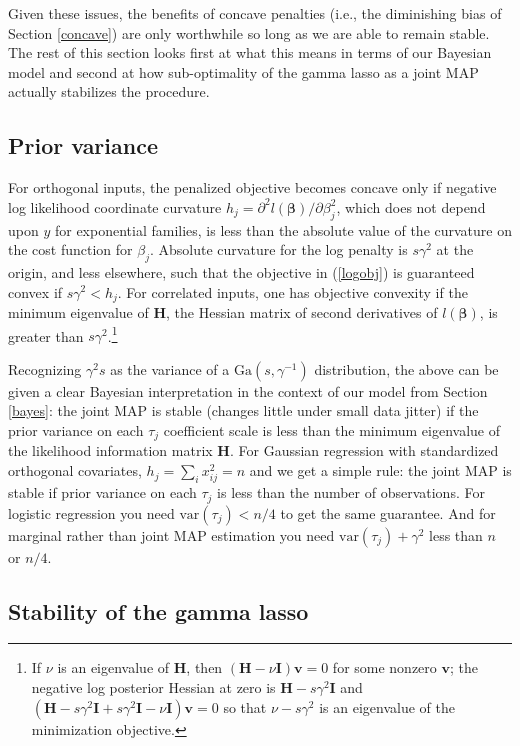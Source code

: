 \documentclass[12pt]{article}
\newcommand{\bs}[1]{\boldsymbol{#1}}
\newcommand{\mr}[1]{\mathrm{#1}}
\newcommand{\bm}[1]{\mathbf{#1}}
\begin{document}
Given these issues, the benefits of concave penalties (i.e., the diminishing bias
of Section \ref{concave}) are only worthwhile so long as we are able to
remain stable.  The rest of this section looks first at what this means in
terms of our Bayesian model and second at how sub-optimality of the gamma
lasso as a joint MAP actually stabilizes the procedure.

\subsection{Prior variance}

For orthogonal inputs, the penalized objective becomes concave only if
negative log likelihood coordinate curvature $h_j = \partial^2 l(\bs{\beta})/\partial
\beta_j^2$, which does not depend upon $y$ for exponential families, is less
than the absolute value of the curvature on the cost function for $\beta_j$.
Absolute curvature for the log penalty is $s\gamma^2$ at the origin, and less
elsewhere, such that  the objective in (\ref{logobj}) is guaranteed convex if
$s\gamma^2 < h_j$.  For correlated inputs, one has objective convexity if the
minimum eigenvalue of $\bm{H}$, the Hessian matrix of second derivatives of
$l(\bs{\beta})$, is greater than $s\gamma^2$.\footnote{ \noindent If $\nu$ is an
eigenvalue of $\bm{H}$, then $(\bm{H} -
\nu \bm{I})\bm{v} = 0$ for some nonzero $\bm{v}$; the negative log posterior
Hessian at zero is $\bm{H} - s\gamma^2\bm{I}$ and $(\bm{H} - s\gamma^2\bm{I} + s\gamma^2\bm{I} -
\nu \bm{I})\bm{v} = 0$ so that 
$\nu - s\gamma^2$ is an eigenvalue of the minimization objective.}

Recognizing $\gamma^2 s$ as the variance of a $\mr{Ga}(s,\gamma^{-1})$
distribution, the above can be given a clear Bayesian interpretation in the
context of our model from Section \ref{bayes}:  the joint MAP is stable
(changes little under small data jitter)  if the prior variance on each
$\tau_j$ coefficient scale is less than the minimum eigenvalue of the likelihood information
matrix $\bm{H}$. For Gaussian regression with standardized orthogonal
covariates, $h_j = \sum_i x_{ij}^2 = n$ and we get a simple rule: the joint
MAP is stable  if prior variance on each $\tau_j$  is
less than the number of observations.  For logistic regression you need
$\mr{var}(\tau_j) < n/4$ to get the same guarantee. And for marginal rather
than joint MAP estimation you need $\mr{var}(\tau_j) + \gamma^2$ less than $n$
or $n/4$.


\subsection{Stability of the gamma lasso}
\end{document}

